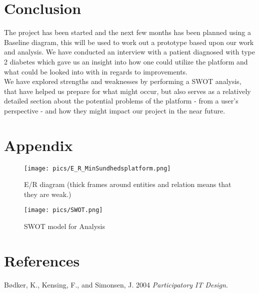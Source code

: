 \documentclass[a4paper,11pt]{article}
\begin{document}

\section{Conclusion}
The project has been started and the next few months has been planned using a Baseline diagram, this will be used to work out a prototype based upon our work and analysis. We have conducted an interview with a patient diagnosed with type 2 diabetes which gave us an insight into how one could utilize the platform and what could be looked into with in regards to improvements.\\

We have explored strengths and weaknesses by performing a SWOT analysis, that have helped us prepare for what might occur, but also serves as a relatively detailed section about the potential problems of the platform - from a user's perspective - and how they might impact our project in the near future. 

\newpage
\section{Appendix}
\begin{figure}[H]
    \centering
    \texttt{[image: pics/E\_R\_MinSundhedsplatform.png]}
    \caption{E/R diagram (thick frames around entities and relation means that they are weak.)}
    \label{fig:er}
\end{figure}

\begin{figure}[H]
    \centering
    \texttt{[image: pics/SWOT.png]}
    \caption{SWOT model for Analysis}
    \label{fig:swot}
\end{figure}

\section{References}
Bødker, K., Kensing, F., and Simonsen, J. 2004 \textit{Participatory IT Design}.
\end{document}
